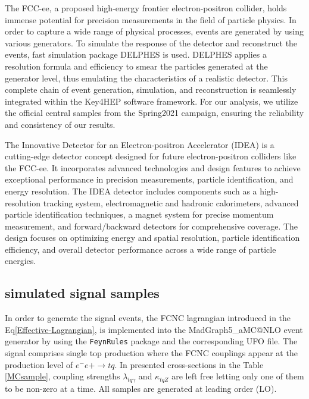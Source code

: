 \documentclass[11pt,onecolumn,english,showpacs,preprintnumbers,amsmath,amssymb,floatfix,nofootinbib]{revtex4-1}
\begin{document}
The FCC-ee, a proposed high-energy frontier electron-positron collider, holds immense potential for precision measurements in the field of particle physics.
In order to capture a wide range of physical processes, events are generated  by using various generators. To simulate the response of the detector and reconstruct the events, fast simulation package DELPHES \cite{} is used. DELPHES applies a resolution formula and efficiency to smear the particles generated at the generator level, thus emulating the characteristics of a realistic detector. This complete chain of event generation, simulation, and reconstruction is seamlessly integrated within the Key4HEP software framework. For our analysis, we utilize the official central samples from the Spring2021 campaign, ensuring the reliability and consistency of our results.
\par
The Innovative Detector for an Electron-positron Accelerator (IDEA) is a cutting-edge detector concept designed for future electron-positron colliders like the FCC-ee. It incorporates advanced technologies and design features to achieve exceptional performance in precision measurements, particle identification, and energy resolution. The IDEA detector includes components such as a high-resolution tracking system, electromagnetic and hadronic calorimeters, advanced particle identification techniques, a magnet system for precise momentum measurement, and forward/backward detectors for comprehensive coverage. The design focuses on optimizing energy and spatial resolution, particle identification efficiency, and overall detector performance across a wide range of particle energies.
\subsection{simulated signal samples}\label{sec:MC-samp}

In order to generate the signal events, the FCNC lagrangian introduced in the Eq\ref{Effective-Lagrangian}, is implemented into the {\sc MadGraph5\_aMC@NLO} event generator by using the  {\tt FeynRules} package and the corresponding UFO file.  The signal comprises single top production where the FCNC couplings appear at the production level of $e^-e+ \rightarrow t q$.  In presented cross-sections in the Table \ref{MCsample}, coupling strengths $\lambda_{tq\gamma}$ and $\kappa_{tqZ}$ are left free letting only one of them to be non-zero at a time. All samples are generated at leading order (LO).
\end{document}
